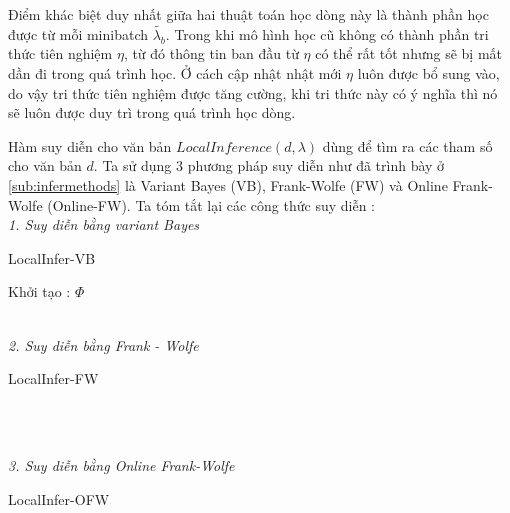 \documentclass[fontsize=13pt]{scrartcl}
\begin{document}
Điểm khác biệt duy nhất giữa hai thuật toán học dòng này là thành phần học được từ mỗi minibatch $\tilde{\lambda_{b}}$. Trong khi mô hình học cũ không có thành phần tri thức tiên nghiệm $\eta$, từ đó thông tin ban đầu từ $\eta$ có thể rất tốt nhưng sẽ bị mất dần đi trong quá trình học. Ở cách cập nhật nhật mới $\eta$ luôn được bổ sung vào, do vậy tri thức tiên nghiệm được tăng cường, khi tri thức này có ý nghĩa thì nó sẽ luôn được duy trì trong quá trình học dòng.
\par
Hàm suy diễn cho văn bản $LocalInference(d,\lambda)$ dùng để tìm ra các tham số cho văn bản $d$. Ta sử dụng 3 phương pháp suy diễn như đã trình bày ở \ref{sub:infermethods} là Variant Bayes (VB), Frank-Wolfe (FW) và Online Frank-Wolfe (Online-FW). Ta tóm tắt lại các công thức suy diễn :\\
\textit{1. Suy diễn bằng variant Bayes}
\begin{algorithm}[H]
\begin{algorithmic}
\caption{LocalInfer-VB}
\label{variantBayes}
\ENSURE{$\Phi$\\}
Khởi tạo : $\Phi$\\
\REPEAT
{}
\\
\end{algorithmic}
\end{algorithm}
\textit{2. Suy diễn bằng Frank - Wolfe}
 \begin{algorithm}[H]
\begin{algorithmic}
\caption{LocalInfer-FW}
\label{frankwolfeInfer}
\ENSURE{$\Phi$\\}
\\
\\
\end{algorithmic}
\end{algorithm} 
\textit{3. Suy diễn bằng Online Frank-Wolfe}
 \begin{algorithm}[H]
\begin{algorithmic}
\caption{LocalInfer-OFW}
\label{frankwolfeInfer}
\ENSURE{$\Phi$\\}
\\
\\
\end{algorithmic}
\end{algorithm} 
\end{document}

